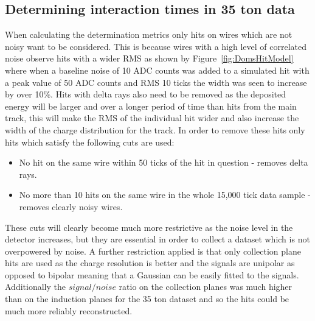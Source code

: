 \subsection{Determining interaction times in 35 ton data}
When calculating the determination metrics only hits on wires which are not noisy want to be considered. This is because wires with a high level of correlated noise observe hits with a wider RMS as shown by Figure~\ref{fig:DomsHitModel} where when a baseline noise of 10 ADC counts was added to a simulated hit with a peak value of 50 ADC counts and RMS 10 ticks the width was seen to increase by over 10\%. Hits with delta rays also need to be removed as the deposited energy will be larger and over a longer period of time than hits from the main track, this will make the RMS of the individual hit wider and also increase the width of the charge distribution for the track. In order to remove these hits only hits which satisfy the following cuts are used:
\begin{itemize}
\item No hit on the same wire within 50 ticks of the hit in question - removes delta rays.
\item No more than 10 hits on the same wire in the whole 15,000 tick data sample - removes clearly noisy wires.
\end{itemize}
These cuts will clearly become much more restrictive as the noise level in the detector increases, but they are essential in order to collect a dataset which is not overpowered by noise. A further restriction applied is that only collection plane hits are used as the charge resolution is better and the signals are unipolar as opposed to bipolar meaning that a Gaussian can be easily fitted to the signals. Additionally the $signal/noise$ ratio on the collection planes was much higher than on the induction planes for the 35 ton dataset and so the hits could be much more reliably reconstructed. \\

